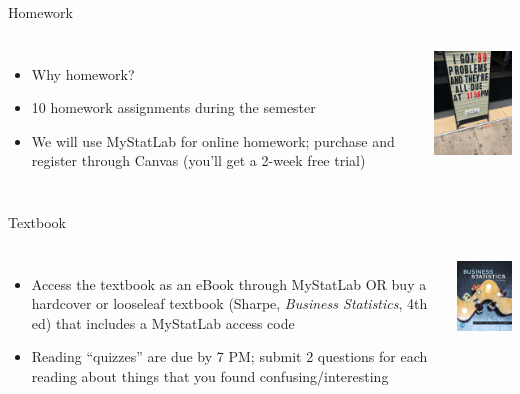 \documentclass{beamer}\usepackage[]{graphicx}\usepackage[]{color}
\begin{document}
\begin{darkframes}
    \begin{frame}{Homework}
      \begin{columns}[onlytextwidth]
          \begin{itemize}
            \item Why homework?
            \item 10 homework assignments during the semester
            \item We will use \alert{MyStatLab} for online homework; purchase and register through Canvas (you'll get a 2-week free trial)
          \end{itemize}
          \includegraphics[width=1.5in]{99problems}
      \end{columns}
    \end{frame}


    \begin{frame}{Textbook}
      \begin{columns}[onlytextwidth]
        \begin{itemize}
          \item Access the textbook as an eBook through MyStatLab OR buy a hardcover or looseleaf textbook (Sharpe, \emph{Business Statistics}, 4th ed) that includes a MyStatLab access code
          \item Reading ``quizzes'' are due by 7 PM; submit 2 questions for each reading about things that you found confusing/interesting
        \end{itemize}
          \includegraphics[width=1.5in]{textbook}
      \end{columns}
    \end{frame}


\end{darkframes}
\end{document}
